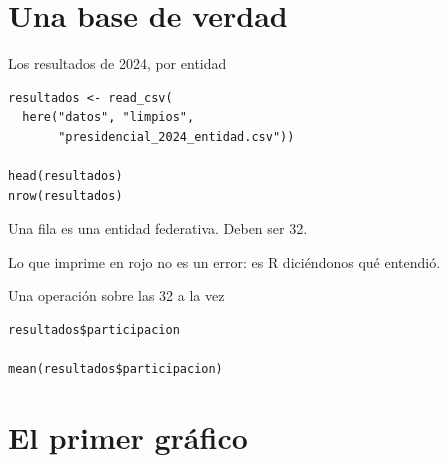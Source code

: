 \section{Una base de verdad}

\begin{frame}[fragile]{Los resultados de 2024, por entidad}
\begin{lstlisting}
resultados <- read_csv(
  here("datos", "limpios",
       "presidencial_2024_entidad.csv"))

head(resultados)
nrow(resultados)
\end{lstlisting}

  \vspace{0.7em}
  Una fila es una entidad federativa. Deben ser 32.

  \vspace{0.4em}
  {\small\color{grisTenue}Lo que  imprime en rojo no es un
  error: es R diciéndonos qué entendió.}
\end{frame}

\begin{frame}[fragile]{Una operación sobre las 32 a la vez}
\begin{lstlisting}
resultados$participacion

mean(resultados$participacion)
\end{lstlisting}

  \vspace{0.9em}
\end{frame}

\section{El primer gráfico}

